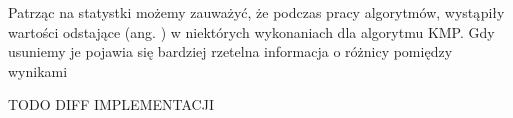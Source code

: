 Patrząc na statystki możemy zauważyć, że podczas pracy algorytmów, wystąpiły 
wartości odstające (ang. ) w niektórych wykonaniach dla 
algorytmu KMP. Gdy usuniemy je pojawia się bardziej rzetelna informacja o 
różnicy pomiędzy wynikami
%


TODO DIFF IMPLEMENTACJI

